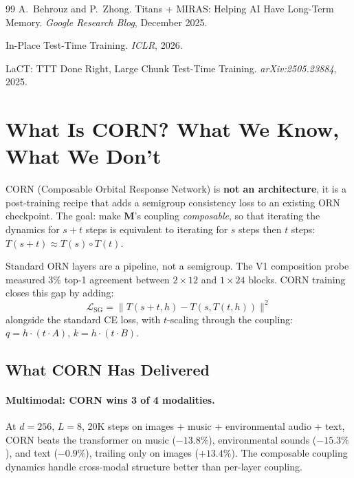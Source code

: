 \documentclass[11pt, a4paper]{article}
\newcommand{\M}{\mathbf{M}}
\theoremstyle{plain}
\theoremstyle{definition}
\theoremstyle{remark}
\begin{document}
\begin{thebibliography}{99}
A.~Behrouz and P.~Zhong.
\newblock Titans + MIRAS: Helping AI Have Long-Term Memory.
\newblock \emph{Google Research Blog}, December 2025.

In-Place Test-Time Training.
\newblock \emph{ICLR}, 2026.

LaCT: TTT Done Right, Large Chunk Test-Time Training.
\newblock \emph{arXiv:2505.23884}, 2025.

\end{thebibliography}


\section{What Is CORN? What We Know, What We Don't}
\label{sec:corn}

CORN (Composable Orbital Response Network) is \textbf{not an architecture}, it is a post-training recipe that adds a semigroup consistency loss to an existing ORN checkpoint.
The goal: make $\M$'s coupling \emph{composable}, so that iterating the dynamics for $s+t$ steps is equivalent to iterating for $s$ steps then $t$ steps: $T(s+t) \approx T(s) \circ T(t)$.

Standard ORN layers are a pipeline, not a semigroup.
The V1 composition probe measured 3\% top-1 agreement between $2\times12$ and $1\times24$ blocks.
CORN training closes this gap by adding:
\[
    \mathcal{L}_{\text{SG}} = \| T(s+t, h) - T(s, T(t, h)) \|^2
\]
alongside the standard CE loss, with $t$-scaling through the coupling: $q = h \cdot (t \cdot A)$, $k = h \cdot (t \cdot B)$.

\subsection{What CORN Has Delivered}

\paragraph{Multimodal: CORN wins 3 of 4 modalities.}
At $d{=}256$, $L{=}8$, 20K steps on images + music + environmental audio + text, CORN beats the transformer on music ($-13.8\%$), environmental sounds ($-15.3\%$), and text ($-0.9\%$), trailing only on images ($+13.4\%$).
The composable coupling dynamics handle cross-modal structure better than per-layer coupling.
\end{document}
